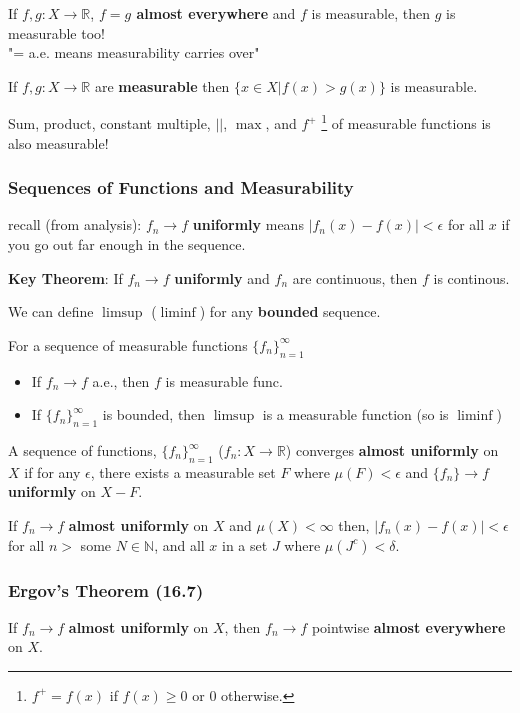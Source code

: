 \documentclass[a4paper, 12pt]{article}
\def\R{\ensuremath{\mathbb{R}}} %
\def\N{\ensuremath{\mathbb{N}}}
\newcommand{\abs}[1]{\left\vert#1\right\vert} %
\newcommand{\bt}[1]{\textbf{#1}} %
\begin{document}
\begin{multicols}{2}
If $f, g: X \rightarrow \R$,
\bt{$f = g$ almost everywhere}
and $f$ is measurable, then
$g$ is measurable too!\\
"= a.e. means measurability carries over"

If $f, g: X \rightarrow \R$ are \bt{measurable} then $\{x \in X | f(x) > g(x)\}$
is measurable.

Sum, product, constant multiple, $||$, $\max$, and $f^+$ 
\footnote{$f^+ = f(x)$ if $f(x) \geq 0$ or $0$ otherwise.
}
of 
measurable functions is also measurable!

\subsubsection{Sequences of Functions and Measurability}
recall (from analysis): $f_n \rightarrow f$ \bt{uniformly} means $|f_n(x) - f(x)| < \epsilon$ for all $x$ if you go out far enough in the sequence.



\bt{Key Theorem}: If $f_n \rightarrow f$ \bt{uniformly} and $f_n$ are continuous, 
    then $f$ is continous.

We can define $\limsup$ ($\liminf$) for any \bt{bounded} sequence.

For a sequence of measurable functions $\{f_n\}_{n=1}^\infty$
\begin{itemize}
    \item If $f_n \rightarrow f$ a.e., then $f$ is measurable func.
    \item If $\{f_n\}_{n=1}^\infty$ is bounded, then $\limsup$ is a measurable function (so is $\liminf$)
\end{itemize}

A sequence of functions, $\{f_n\}_{n=1}^\infty$ 
($f_n: X \rightarrow \R$) converges 
\bt{almost uniformly} on $X$ if 
for any $\epsilon$, there exists a measurable set $F$ where 
$\mu(F) < \epsilon$ and $\{f_n\} \rightarrow f$ 
\bt{uniformly} on $X-F$.


If $f_n \rightarrow f$ \bt{almost uniformly} on $X$ and $\mu(X) < \infty$
then, $\abs{f_n(x) - f(x)} < \epsilon$ for all $n > $ some $N \in \N$, 
and all $x$ in a set $J$ where $\mu(J^c) < \delta$.


\subsubsection{Ergov's Theorem (16.7)}
If $f_n \rightarrow f$ \bt{almost uniformly} on $X$, 
then $f_n \rightarrow f$ pointwise \bt{almost everywhere} on $X$.


\end{multicols}
\end{document}
